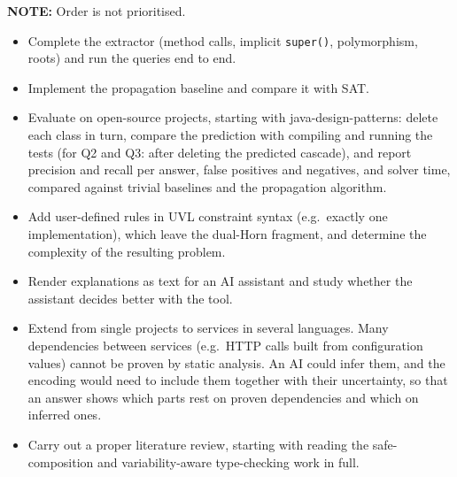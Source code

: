 \documentclass[11pt,a4paper]{article}
\newcommand{\code}[1]{\texttt{#1}}
\begin{document}
\textbf{NOTE:} Order is not prioritised.

\begin{itemize}
  \item Complete the extractor (method calls, implicit \code{super()},
        polymorphism, roots) and run the queries end to end.
  \item Implement the propagation baseline and compare it with SAT.
  \item Evaluate on open-source projects, starting with
        java-design-patterns: delete each class in turn, compare
        the prediction with compiling and running the tests (for Q2 and Q3:
        after deleting the predicted cascade), and report precision and
        recall per answer, false positives and negatives, and solver time,
        compared against trivial baselines and the propagation algorithm.
  \item Add user-defined rules in UVL constraint syntax (e.g.\ exactly one
        implementation), which leave the dual-Horn fragment, and determine
        the complexity of the resulting problem.
  \item Render explanations as text for an AI assistant and study whether
        the assistant decides better with the tool.
  \item Extend from single projects to services in several languages. Many
        dependencies between services (e.g.\ HTTP calls built from
        configuration values) cannot be proven by static analysis. An AI
        could infer them, and the encoding would need to include them
        together with their uncertainty, so that an answer shows which parts
        rest on proven dependencies and which on inferred ones.
  \item Carry out a proper literature review, starting with reading the
        safe-composition and variability-aware type-checking work in full.
\end{itemize}



\end{document}
